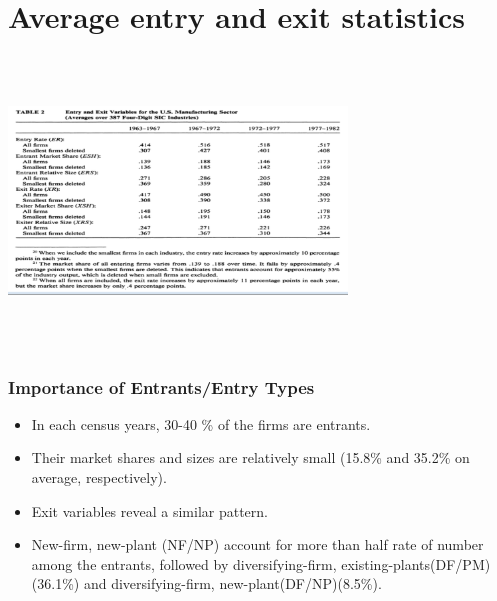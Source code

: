 \documentclass[dvipdfmx,12pt]{beamer}
\begin{document}
\section{Average entry and exit statistics}
\begin{frame}

\begin{center}

\includegraphics[width=9cm,height=7.75cm]{DRS_T2.pdf}

\end{center}

\end{frame}

\begin{frame}\frametitle{Importance of Entrants/Entry Types}

 \begin{itemize}
 
 \item In each census years, 30-40 \% of the firms are entrants.
 
 \item Their market shares and sizes are relatively small (15.8\% and 35.2\% on average, respectively). 
 
 \item Exit variables reveal a similar pattern.
 
 \item New-firm, new-plant (NF/NP) account for more than half rate of number among the entrants, followed by diversifying-firm, existing-plants(DF/PM)(36.1\%) and diversifying-firm, new-plant(DF/NP)(8.5\%).
 
 \end{itemize}

\end{frame}
\end{document}
